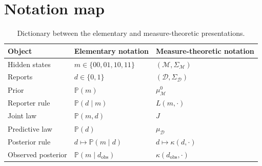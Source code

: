 \documentclass[11pt]{article}
\newcommand{\M}{\mathcal{M}}
\newcommand{\D}{\mathcal{D}}
\newcommand{\SigmaM}{\Sigma_{\M}}
\newcommand{\SigmaD}{\Sigma_{\D}}
\newcommand{\muMzero}{\mu^0_{\M}}
\newcommand{\muD}{\mu_{\D}}
\newcommand{\dobs}{d_{\mathrm{obs}}}
\begin{document}
\section{Notation map}
\begin{table}[h]
\centering
\begin{tabular}{l l l}
\toprule
Object & Elementary notation & Measure-theoretic notation \\
\midrule
Hidden states & \(m\in\{00,01,10,11\}\) & \((\M,\SigmaM)\) \\
Reports & \(d\in\{0,1\}\) & \((\D,\SigmaD)\) \\
Prior & \(\mathbb{P}(m)\) & \(\muMzero\) \\
Reporter rule & \(\mathbb{P}(d\mid m)\) & \(L(m,\cdot)\) \\
Joint law & \(\mathbb{P}(m,d)\) & \(J\) \\
Predictive law & \(\mathbb{P}(d)\) & \(\muD\) \\
Posterior rule & \(d\mapsto\mathbb{P}(m\mid d)\) & \(d\mapsto\kappa(d,\cdot)\) \\
Observed posterior & \(\mathbb{P}(m\mid \dobs)\) & \(\kappa(\dobs,\cdot)\) \\
\bottomrule
\end{tabular}
\caption{Dictionary between the elementary and measure-theoretic presentations.}
\end{table}
\end{document}
